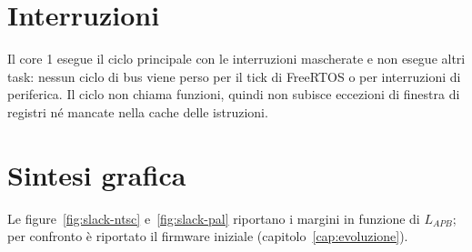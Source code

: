 \documentclass[11pt,a4paper,twoside,openright]{report}
\begin{document}
\section{Interruzioni}

Il core 1 esegue il ciclo principale con le interruzioni mascherate e non esegue altri task:
nessun ciclo di bus viene perso per il tick di FreeRTOS o per interruzioni di periferica.
Il ciclo non chiama funzioni, quindi non subisce eccezioni di finestra di registri né
mancate nella cache delle istruzioni.

\section{Sintesi grafica}

Le figure~\ref{fig:slack-ntsc} e~\ref{fig:slack-pal} riportano i margini in funzione di
$L_{APB}$; per confronto è riportato il firmware iniziale (capitolo~\ref{cap:evoluzione}).
\end{document}
